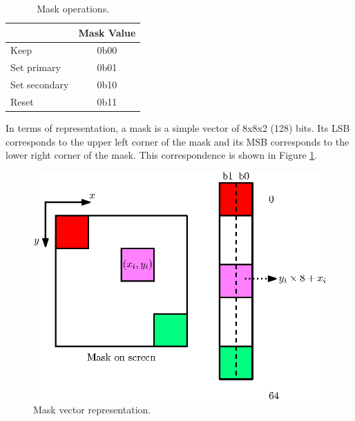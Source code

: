 \begin{table}[H]
    \centering
    \begin{tabular}{|l|c|}
    \hline
    \rowcolor[HTML]{DAE8FC} 
    \multicolumn{1}{|c|}{\cellcolor[HTML]{DAE8FC}\textbf{Mask Operation}} & \textbf{Mask Value} \\ \hline
    Keep                                                                  & 0b00                \\ \hline
    Set primary                                                           & 0b01                \\ \hline
    Set secondary                                                         & 0b10                \\ \hline
    Reset                                                                 & 0b11                \\ \hline
    \end{tabular}
    \caption{Mask operations.}
    \label{tab:mask_op}
\end{table}

In terms of representation, a mask is a simple vector of 8x8x2 (128) bits. Its LSB corresponds to 
the upper left corner of the mask and its MSB corresponds to the lower right corner of the mask. 
This correspondence is shown in Figure \ref{fig:gpu/mask_vector}.

\begin{figure}[H]
    \centering
    \includegraphics[scale=1.0]{Chapter4-GPU_CLKU/res/mask_vector}
    \caption{Mask vector representation.}
    \label{fig:gpu/mask_vector}
\end{figure}

